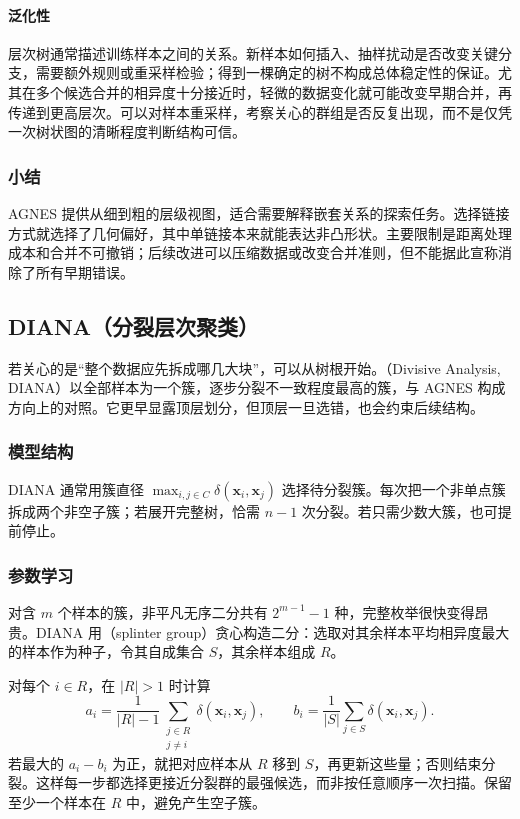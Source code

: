\paragraph{泛化性}
层次树通常描述训练样本之间的关系。新样本如何插入、抽样扰动是否改变关键分支，需要额外规则或重采样检验；得到一棵确定的树不构成总体稳定性的保证。尤其在多个候选合并的相异度十分接近时，轻微的数据变化就可能改变早期合并，再传递到更高层次。可以对样本重采样，考察关心的群组是否反复出现，而不是仅凭一次树状图的清晰程度判断结构可信。

\subsubsection{小结}

AGNES 提供从细到粗的层级视图，适合需要解释嵌套关系的探索任务。选择链接方式就选择了几何偏好，其中单链接本来就能表达非凸形状。主要限制是距离处理成本和合并不可撤销；后续改进可以压缩数据或改变合并准则，但不能据此宣称消除了所有早期错误。

\subsection{DIANA（分裂层次聚类）}

若关心的是“整个数据应先拆成哪几大块”，可以从树根开始。（Divisive Analysis, DIANA）以全部样本为一个簇，逐步分裂不一致程度最高的簇，与 AGNES 构成方向上的对照。它更早显露顶层划分，但顶层一旦选错，也会约束后续结构。

\subsubsection{模型结构}

DIANA 通常用簇直径 $\max_{i,j\in C}\delta(\bm{x}_i,\bm{x}_j)$ 选择待分裂簇。每次把一个非单点簇拆成两个非空子簇；若展开完整树，恰需 $n-1$ 次分裂。若只需少数大簇，也可提前停止。

\subsubsection{参数学习}

对含 $m$ 个样本的簇，非平凡无序二分共有 $2^{m-1}-1$ 种，完整枚举很快变得昂贵。DIANA 用（splinter group）贪心构造二分：选取对其余样本平均相异度最大的样本作为种子，令其自成集合 $S$，其余样本组成 $R$。

对每个 $i\in R$，在 $|R|>1$ 时计算
\[
 a_i=\frac{1}{|R|-1}\sum_{\substack{j\in R\\j\ne i}}
 \delta(\bm{x}_i,\bm{x}_j),\qquad
 b_i=\frac{1}{|S|}\sum_{j\in S}\delta(\bm{x}_i,\bm{x}_j).
\]
若最大的 $a_i-b_i$ 为正，就把对应样本从 $R$ 移到 $S$，再更新这些量；否则结束分裂。这样每一步都选择更接近分裂群的最强候选，而非按任意顺序一次扫描。保留至少一个样本在 $R$ 中，避免产生空子簇。

